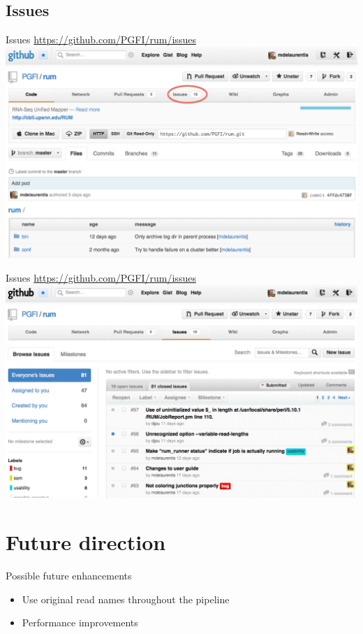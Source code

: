 \documentclass{beamer}
\begin{document}
\subsection{Issues}

\centering
\begin{frame}{Issues}
  \url{https://github.com/PGFI/rum/issues}
  \includegraphics[scale=0.2]{github-main-issues.png}
\end{frame}

\centering
\begin{frame}{Issues}
  \url{https://github.com/PGFI/rum/issues}
  \includegraphics[scale=0.2]{github-issues.png}
\end{frame}

\section{Future direction}

\begin{frame}{Possible future enhancements}
  \begin{itemize}
  \item Use original read names throughout the pipeline
  \item Performance improvements
  \end{itemize}
\end{frame}
\end{document}
